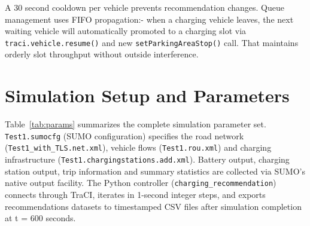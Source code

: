 \documentclass[conference]{IEEEtran}
\begin{document}
A 30 second cooldown per vehicle prevents recommendation changes. Queue
management uses FIFO propagation:- when a charging vehicle leaves, the
next waiting vehicle will automatically promoted to a charging slot via
\texttt{traci.vehicle.resume()} and new \texttt{setParkingAreaStop()}
call. That maintains orderly slot throughput without outside
interference.

\vspace{-3mm}
\section{Simulation Setup and Parameters}

Table~\ref{tab:params} summarizes the complete simulation parameter
set. \texttt{Test1.sumocfg} (SUMO configuration) specifies the road
network (\texttt{Test1\_with\_TLS.net.xml}), vehicle flows
(\texttt{Test1.rou.xml}) and charging infrastructure
(\texttt{Test1.chargingstations.add.xml}). Battery output, charging
station output, trip information and summary statistics are collected
via SUMO's native output facility. The Python controller
(\texttt{charging\_recommendation}) connects through TraCI, iterates in
1-second integer steps, and exports recommendations datasets to
timestamped CSV files after simulation completion at t = 600 seconds.
\end{document}
